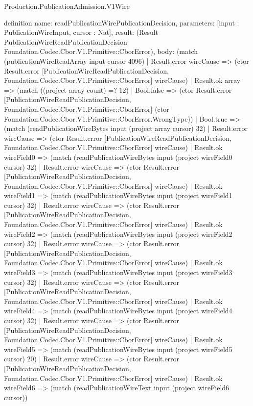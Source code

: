 \begin{lexlean}{Production.PublicationAdmission.V1Wire}
\begin{semanticmodule}
definition{
  name: readPublicationWirePublicationDecision,
  parameters: [input : PublicationWireInput, cursor : Nat],
  result: (Result PublicationWireReadPublicationDecision Foundation.Codec.Cbor.V1.Primitive::CborError),
  body: (match (publicationWireReadArray input cursor 4096)
    | Result.error wireCause => (ctor Result.error [PublicationWireReadPublicationDecision, Foundation.Codec.Cbor.V1.Primitive::CborError] wireCause)
    | Result.ok array => (match ((project array count) =? 12)
      | Bool.false => (ctor Result.error [PublicationWireReadPublicationDecision, Foundation.Codec.Cbor.V1.Primitive::CborError] (ctor Foundation.Codec.Cbor.V1.Primitive::CborError.WrongType))
      | Bool.true => (match (readPublicationWireBytes input (project array cursor) 32)
        | Result.error wireCause => (ctor Result.error [PublicationWireReadPublicationDecision, Foundation.Codec.Cbor.V1.Primitive::CborError] wireCause)
        | Result.ok wireField0 => (match (readPublicationWireBytes input (project wireField0 cursor) 32)
          | Result.error wireCause => (ctor Result.error [PublicationWireReadPublicationDecision, Foundation.Codec.Cbor.V1.Primitive::CborError] wireCause)
          | Result.ok wireField1 => (match (readPublicationWireBytes input (project wireField1 cursor) 32)
            | Result.error wireCause => (ctor Result.error [PublicationWireReadPublicationDecision, Foundation.Codec.Cbor.V1.Primitive::CborError] wireCause)
            | Result.ok wireField2 => (match (readPublicationWireBytes input (project wireField2 cursor) 32)
              | Result.error wireCause => (ctor Result.error [PublicationWireReadPublicationDecision, Foundation.Codec.Cbor.V1.Primitive::CborError] wireCause)
              | Result.ok wireField3 => (match (readPublicationWireBytes input (project wireField3 cursor) 32)
                | Result.error wireCause => (ctor Result.error [PublicationWireReadPublicationDecision, Foundation.Codec.Cbor.V1.Primitive::CborError] wireCause)
                | Result.ok wireField4 => (match (readPublicationWireBytes input (project wireField4 cursor) 32)
                  | Result.error wireCause => (ctor Result.error [PublicationWireReadPublicationDecision, Foundation.Codec.Cbor.V1.Primitive::CborError] wireCause)
                  | Result.ok wireField5 => (match (readPublicationWireBytes input (project wireField5 cursor) 20)
                    | Result.error wireCause => (ctor Result.error [PublicationWireReadPublicationDecision, Foundation.Codec.Cbor.V1.Primitive::CborError] wireCause)
                    | Result.ok wireField6 => (match (readPublicationWireText input (project wireField6 cursor))
}
\end{semanticmodule}
\end{lexlean}
